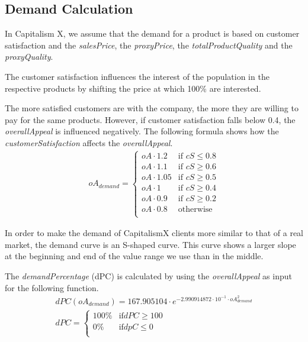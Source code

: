 \subsection{Demand Calculation} \label{demandCalc}

In Capitalism X, we assume that the demand for a product is based on customer satisfaction and the \textit{salesPrice}, the \textit{proxyPrice}, the \textit{totalProductQuality} and the \textit{proxyQuality}.

The customer satisfaction influences the interest of the population in the respective products by shifting the price at which 100\% are interested.
 
The more satisfied customers are with the company, the more they are willing to pay for the same products. However, if customer satisfaction falls below 0.4, the \textit{overallAppeal} is influenced negatively. The following formula shows how the \textit{customerSatisfaction} affects the \textit{overallAppeal}.
\begin{equation}
\label{func:demandPrice}
\begin{aligned}
 oA_{demand} = 
\begin{cases}
    oA \cdot 1.2 & \text{if } cS \leq 0.8 \\
    oA \cdot 1.1 & \text{if } cS \geq 0.6 \\
    oA \cdot 1.05 & \text{if } cS \geq 0.5 \\
    oA \cdot 1 & \text{if } cS \geq 0.4 \\
    oA \cdot 0.9 & \text{if } cS \geq 0.2 \\
    oA \cdot 0.8 & \text{otherwise} \\
\end{cases}
\end{aligned}
\end{equation}

In order to make the demand of CapitalismX clients more similar to that of a real market, the demand curve is an S-shaped curve. This curve shows a larger slope at the beginning and end of the value range we use than in the middle.

The \textit{demandPercentage} (\gls{dPC}) is calculated by using the \textit{overallAppeal} as input for the following function. 
\begin{equation}
\label{func:demandPercentage}
\begin{aligned}
dPC(oA_{demand}) = 167.905104 \cdot e^{−2.990914872 \cdot 10^{ -1 } \cdot oA_{demand}^{ 2 } } \\
dPC = 
    \begin{cases}
        100\% & \text{if} dPC \geq 100\\
        0\% & \text{if} dpC \leq 0\\
    \end{cases}
\end{aligned}
\end{equation}

